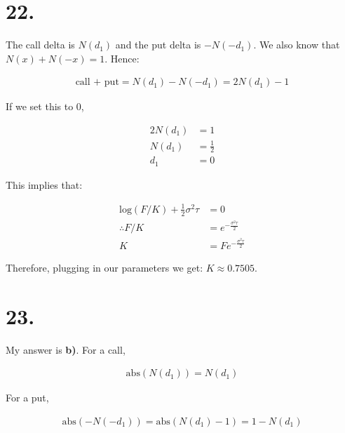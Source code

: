 \documentclass[paper=a4, fontsize=11pt]{scrartcl} %
\numberwithin{equation}{section} %
\numberwithin{figure}{section} %
\numberwithin{table}{section} %
\begin{document}

\section*{22.}

The call delta is $N(d_1)$ and the put delta is $-N(-d_1)$.  We also know that $N(x) + N(-x) = 1$.  Hence:

\begin{align*}
\text{call + put} = N(d_1) - N(-d_1) = 2N(d_1)-1
\end{align*}

If we set this to 0,

\begin{align*}
2N(d_1) &= 1\\
N(d_1) &= \frac{1}{2}\\
d_1 &= 0
\end{align*}

This implies that:

\begin{align*}
\text{log}(F/K) + \frac{1}{2}\sigma^2 \tau &= 0\\
\therefore F/K &= e^{-\frac{\sigma^2 \tau}{2}}\\
K &= Fe^{-\frac{\sigma^2 \tau}{2}}
\end{align*}

Therefore, plugging in our parameters we get: $K \approx 0.7505$.  


\section*{23.}

My answer is \textbf{b)}. For a call, 

\begin{align*}
\text{abs}(N(d_1)) = N(d_1)
\end{align*}

For a put,

\begin{align*}
\text{abs}(-N(-d_1)) =  \text{abs}(N(d_1)-1) = 1 - N(d_1)
\end{align*}
\end{document}
